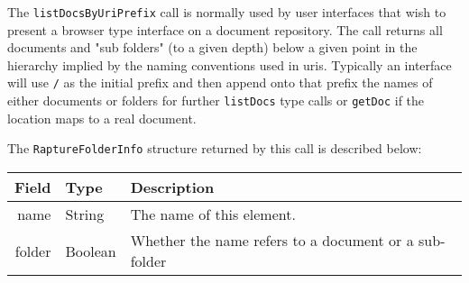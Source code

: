 The \verb+listDocsByUriPrefix+ call is normally used by user interfaces that wish
to present a browser type interface on a document repository. The call returns all documents
and "sub folders" (to a given depth) below a given point in the hierarchy implied
by the naming conventions used in uris. Typically an interface will use \verb+/+ as
the initial prefix and then append onto that prefix the names of either documents
or folders for further \verb+listDocs+ type calls or \verb+getDoc+ if the location
maps to a real document.

The \verb+RaptureFolderInfo+ structure returned by this call is described below:

\begin{table}[ht]
\begin{center}
\begin{tabular}{r l p{8cm}}
  Field & Type & Description \\
  \hline
  name & String & The name of this element. \\
  folder & Boolean & Whether the name refers to a document or a sub-folder \\
\end{tabular}
\end{center}
\end{table}
